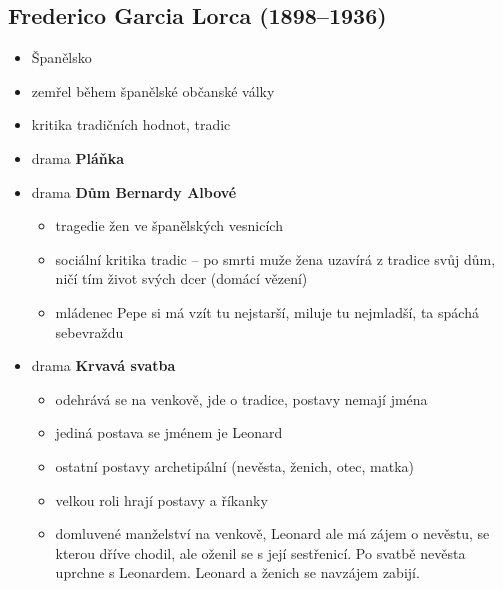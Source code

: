 \subsection{Frederico Garcia Lorca (1898--1936)}
\begin{itemize}
\item Španělsko
\item zemřel během španělské občanské války
\item kritika tradičních hodnot, tradic
\item drama \textbf{Pláňka}
\item drama \textbf{Dům Bernardy Albové}
	\begin{itemize}
	\item tragedie žen ve španělských vesnicích 
	\item sociální kritika tradic -- po smrti muže žena uzavírá z tradice svůj dům, ničí tím život svých dcer (domácí vězení)
	\item mládenec Pepe si má vzít tu nejstarší, miluje tu nejmladší, ta spáchá sebevraždu
	\end{itemize}
\item drama \textbf{Krvavá svatba}
	\begin{itemize}
	\item odehrává se na venkově, jde o tradice, postavy nemají jména
	\item jediná postava se jménem je Leonard
	\item ostatní postavy archetipální (nevěsta, ženich, otec, matka)
	\item velkou roli hrají postavy a říkanky
	\item domluvené manželství na venkově, Leonard ale má zájem o nevěstu, se kterou dříve chodil, ale oženil se s její sestřenicí. Po svatbě nevěsta uprchne s Leonardem. Leonard a ženich se navzájem zabijí.
	\end{itemize}
\end{itemize}

